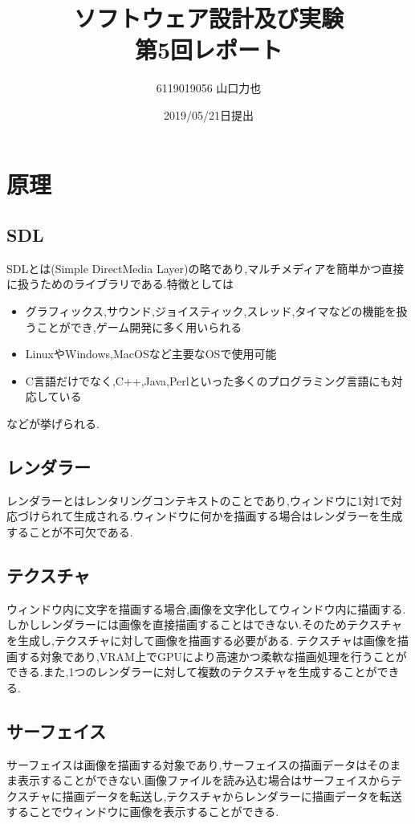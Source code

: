 \documentclass{jarticle}
\title{ソフトウェア設計及び実験\\
	第5回レポート}
\author{6119019056 山口力也}
\date{2019/05/21日提出}
\begin{document}
	\maketitle
	\section{原理}
	\subsection{SDL}
	SDLとは(Simple DirectMedia Layer)の略であり,マルチメディアを簡単かつ直接に扱うためのライブラリである.特徴としては

	\begin{itemize}

	\item グラフィックス,サウンド,ジョイスティック,スレッド,タイマなどの機能を扱うことができ,ゲーム開発に多く用いられる
	\item LinuxやWindows,MacOSなど主要なOSで使用可能
	\item C言語だけでなく,C++,Java,Perlといった多くのプログラミング言語にも対応している
	\end{itemize}
	などが挙げられる.
	\subsection{レンダラー}
	レンダラーとはレンタリングコンテキストのことであり,ウィンドウに1対1で対応づけられて生成される.ウィンドウに何かを描画する場合はレンダラーを生成することが不可欠である.
	\subsection{テクスチャ}
	ウィンドウ内に文字を描画する場合,画像を文字化してウィンドウ内に描画する.しかしレンダラーには画像を直接描画することはできない.そのためテクスチャを生成し,テクスチャに対して画像を描画する必要がある.
	テクスチャは画像を描画する対象であり,VRAM上でGPUにより高速かつ柔軟な描画処理を行うことができる.また,1つのレンダラーに対して複数のテクスチャを生成することができる.

	\subsection{サーフェイス}
	サーフェイスは画像を描画する対象であり,サーフェイスの描画データはそのまま表示することができない.画像ファイルを読み込む場合はサーフェイスからテクスチャに描画データを転送し,テクスチャからレンダラーに描画データを転送することでウィンドウに画像を表示することができる.
\end{document}
